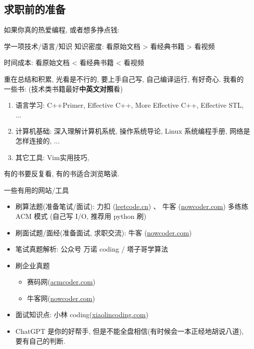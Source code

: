 \documentclass{ctexbeamer}
\begin{document}
\subsection{求职前的准备}
\begin{frame}
	如果你真的热爱编程, 或者想多挣点钱:
	\begin{alertblock}{学一项技术/语言/知识}
		知识密度: 看原始文档 > 看经典书籍 > 看视频

		时间成本: 看原始文档 < 看经典书籍 < 看视频
	\end{alertblock}
	重在总结和积累, 光看是不行的, 要上手自己写, 自己编译运行, 有好奇心.
	我看的一些书: (技术类书籍最好\textbf{中英文对照}看)
	\begin{enumerate}
		\item 语言学习: C++Primer, Effective C++, More Effective C++, Effective STL, ...
		\item 计算机基础: 深入理解计算机系统, 操作系统导论, Linux 系统编程手册, 网络是怎样连接的, ...
		\item 其它工具: Vim实用技巧,
	\end{enumerate}
	有的书要反复看, 有的书适合浏览略读.

\end{frame}


\begin{frame}{一些有用的网站/工具}
	\begin{itemize}
		\item 刷算法题(准备笔试/面试): 力扣 (\hyperref[https://leetcode.cn]{leetcode.cn}) 、 牛客 (\hyperref[https://nowcoder.com]{nowcoder.com}) 多练练ACM 模式 (自己写 I/O, 推荐用 python 刷)
		\item 刷面试题/面经(准备面试, 求职交流): 牛客 (\hyperref[https://nowcoder.com]{nowcoder.com})
		\item 笔试真题解析: 公众号 万诺 coding / 塔子哥学算法
		\item 刷企业真题
		      \begin{itemize}
			      \item 赛码网(\hyperref[https://acmcoder.com]{acmcoder.com})
			      \item 牛客网(\hyperref[https://nowcoder.com]{nowcoder.com})
		      \end{itemize}
		\item 面试知识点: 小林 coding(\hyperref[https://xiaolincoding.com]{xiaolincoding.com})
		\item ChatGPT 是你的好帮手, 但是不能全盘相信(有时候会一本正经地胡说八道), 要有自己的判断.
	\end{itemize}
\end{frame}
\end{document}

